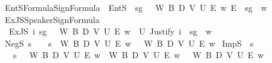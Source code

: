 \begin{isabellebody}
\isamarkupfalse%
\ EntS{\isacharcolon}{\kern0pt}{\isacharcolon}{\kern0pt}{\isachardoublequoteopen}Formula{\isasymRightarrow}Sign{\isasymRightarrow}Formula{\isasymRightarrow}{\isasymsigma}{\isachardoublequoteclose}\ \ {\isachardoublequoteopen}EntS\ {\isasymPhi}\ sg\ {\isasymphi}\ {\isasymequiv}\ {\isasymlambda}W\ B\ D\ V\ U\ E\ w{\isachardot}{\kern0pt}\ E\ {\isasymPhi}\ sg\ {\isasymphi}\ w{\isachardoublequoteclose}\isanewline
{}\isamarkupfalse%
\ ExJS{\isacharcolon}{\kern0pt}{\isacharcolon}{\kern0pt}{\isachardoublequoteopen}Speaker{\isasymRightarrow}Sign{\isasymRightarrow}Formula{\isasymRightarrow}{\isasymsigma}{\isachardoublequoteclose}\ \isanewline
\ \ {\isachardoublequoteopen}ExJS\ i\ sg\ {\isasymphi}\ {\isasymequiv}\ {\isasymlambda}W\ B\ D\ V\ U\ E\ w{\isachardot}{\kern0pt}\ {\isasymexists}{\isasymDelta}{\isachardot}{\kern0pt}\ U\ {\isacharparenleft}{\kern0pt}Justify\ i\ {\isasymDelta}\ sg\ {\isasymphi}{\isacharparenright}{\kern0pt}\ w{\isachardoublequoteclose}\isanewline
{}\isamarkupfalse%
\ NegS{\isacharcolon}{\kern0pt}{\isacharcolon}{\kern0pt}{\isachardoublequoteopen}{\isasymsigma}{\isasymRightarrow}{\isasymsigma}{\isachardoublequoteclose}\ {\isacharparenleft}{\kern0pt}{\isachardoublequoteopen}{\isasymnot}\isactrlsup s{\isacharunderscore}{\kern0pt}{\isachardoublequoteclose}\ {\isacharbrackleft}{\kern0pt}{}{}{\isacharbrackright}{\kern0pt}\ {}{}{\isacharparenright}{\kern0pt}\ \ {\isachardoublequoteopen}{\isasymnot}\isactrlsup s{\isasymphi}\ {\isasymequiv}\ {\isasymlambda}W\ B\ D\ V\ U\ E\ w{\isachardot}{\kern0pt}\ {\isasymnot}\ {\isasymphi}\ W\ B\ D\ V\ U\ E\ w{\isachardoublequoteclose}\isanewline
{}\isamarkupfalse%
\ ImpS{\isacharcolon}{\kern0pt}{\isacharcolon}{\kern0pt}{\isachardoublequoteopen}{\isasymsigma}{\isasymRightarrow}{\isasymsigma}{\isasymRightarrow}{\isasymsigma}{\isachardoublequoteclose}\ {\isacharparenleft}{\kern0pt}\ {\isachardoublequoteopen}{\isasymsupset}\isactrlsup s{\isachardoublequoteclose}\ {}{}{\isacharparenright}{\kern0pt}\ \isanewline
\ \ {\isachardoublequoteopen}{\isasymphi}\ {\isasymsupset}\isactrlsup s\ {\isasympsi}\ {\isasymequiv}\ {\isasymlambda}W\ B\ D\ V\ U\ E\ w{\isachardot}{\kern0pt}\ {\isasymphi}\ W\ B\ D\ V\ U\ E\ w\ {\isasymlongrightarrow}\ {\isasympsi}\ W\ B\ D\ V\ U\ E\ w{\isachardoublequoteclose}\isanewline
{}\isamarkupfalse%

\end{isabellebody}
